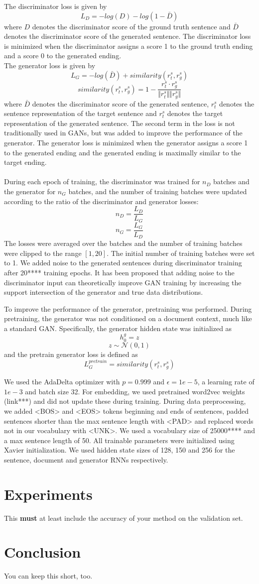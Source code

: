 \documentclass{article}
\begin{document}
The discriminator loss is given by
$$ L_{D} = -log(D) - log(1-\bar{D})$$
where $D$ denotes the discriminator score of the ground truth sentence and $\bar{D}$ denotes the discriminator score of the generated sentence. The discriminator loss is minimized when the discriminator assigns a score 1 to the ground truth ending and a score 0 to the generated ending. \\
The generator loss is given by
$$ L_{G} = -log(\bar{D}) + similarity(r^{s}_{t}, r^{s}_{g}) $$
$$ similarity(r^{s}_{t}, r^{s}_{g}) = 1 - \frac{r^{s}_{t} \cdot r^{s}_{g}}{\Vert r^{s}_{t} \Vert \Vert r^{s}_{g} \Vert} $$
where $\bar{D}$ denotes the discriminator score of the generated sentence, $r^{s}_{t}$ denotes the sentence representation of the target sentence and $r^{s}_{t}$ denotes the target representation of the generated sentence. The second term in the loss is not traditionally used in GANs, but was added to improve the performance of the generator. The generator loss is minimized when the generator assigns a score 1 to the generated ending and the generated ending is maximally similar to the target ending. \\ \\
During each epoch of training, the discriminator was trained for $n_{D}$ batches and the generator for $n_{G}$ batches, and the number of training batches were updated according to the ratio of the discriminator and generator losses:
$$ n_{D} = \frac{L_{D}}{L_{G}} $$ 
$$ n_{G} = \frac{L_{G}}{L_{D}} $$
The losses were averaged over the batches and the number of training batches were clipped to the range $[1,20]$. The initial number of training batches were set to 1.
We added noise to the generated sentences during discriminator training after 20**** training epochs. It has been proposed that adding noise to the discriminator input can theoretically improve GAN training by increasing the support intersection of the generator and true data distributions.

To improve the performance of the generator, pretraining was performed. During pretraining, the generator was not conditioned on a document context, much like a standard GAN. Specifically, the generator hidden state was initialized as
$$ h^{g}_{0} = z $$
$$ z \sim \mathcal{N}(0,1) $$
and the pretrain generator loss is defined as
$$ L_{G}^{pretrain} = similarity(r^{s}_{t}, r^{s}_{g}) $$

We used the AdaDelta optimizer with $p=0.999$ and $\epsilon=1e-5$, a learning rate of $1e-3$ and batch size 32. For embedding, we used pretrained word2vec weights (link***) and did not update these during training. During data preprocessing, we added <BOS> and <EOS> tokens beginning and ends of sentences, padded sentences shorter than the max sentence length with <PAD> and replaced words not in our vocabulary with <UNK>. We used a vocabulary size of 25000**** and a max sentence length of 50. All trainable parameters were initialized using Xavier initialization. We used hidden state sizes of 128, 150 and 256 for the sentence, document and generator RNNs respectively.

\section{Experiments}
This {\bf must} at least include the accuracy of your method on the validation set.
\section{Conclusion}
You can keep this short, too.
\end{document}
